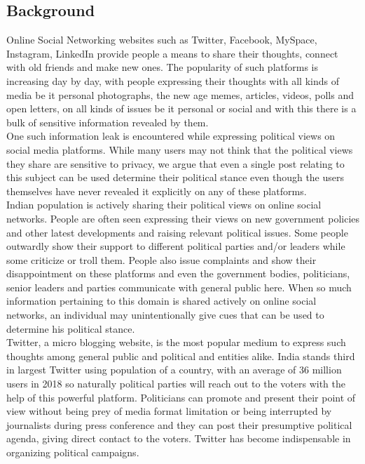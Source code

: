 \documentclass[a4paper,11pt]{article}
\begin{document}
\subsection{Background}
Online Social Networking websites such as Twitter, Facebook, MySpace, Instagram, LinkedIn provide people a means to share their thoughts, connect with old friends and make new ones. The popularity of such platforms is increasing day by day, with people expressing their thoughts with all kinds of media be it personal photographs, the new age memes, articles, videos, polls and open letters, on all kinds of issues be it personal or social and with this there is a bulk of sensitive information revealed by them. 
\medskip\\
One such information leak is encountered while expressing political views on social media platforms. While many users may not think that the political views they share are sensitive to privacy, we argue that even a single post relating to this subject can be used determine their political stance even though the users themselves have never revealed it explicitly on any of these platforms.
\medskip\\
Indian population is actively sharing their political views on online social networks. People are often seen expressing their views on new government policies and other latest developments and raising relevant political issues. Some people outwardly show their support to different political parties and/or leaders while some criticize or troll them. People also issue complaints and show their disappointment on these platforms and even the government bodies, politicians, senior leaders and parties communicate with general public here. When so much information pertaining to this domain is shared actively on online social networks, an individual may unintentionally give cues that can be used to determine his political stance.
\medskip\\
Twitter, a micro blogging website, is the most popular medium to express such thoughts among general public and political and entities alike. India stands third in largest Twitter using population of a country, with an average of 36 million users in 2018 so naturally political parties will reach out to the voters with the help of this powerful platform. Politicians can promote and present their point of view without being prey of media format limitation or being interrupted by journalists during press conference and they can post their presumptive political agenda, giving direct contact to the voters. Twitter has become indispensable in organizing political campaigns. 
\end{document}
